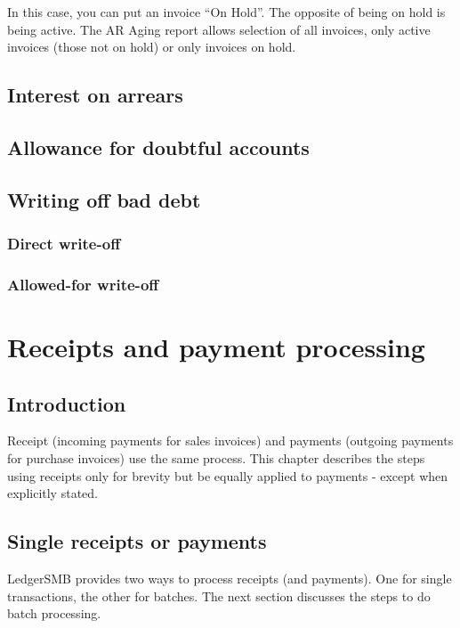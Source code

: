 In this case, you can put an invoice ``On Hold''. The opposite of being on hold is
being active. The AR Aging report allows selection of all invoices, only active
invoices (those not on hold) or only invoices on hold.


\section{Interest on arrears}

\section{Allowance for doubtful accounts}



\section{Writing off bad debt}

\subsection{Direct write-off}

\subsection{Allowed-for write-off}


\chapter{Receipts and payment processing}

\section{Introduction}

Receipt (incoming payments for sales invoices) and payments (outgoing payments
for purchase invoices) use the same process. This chapter describes the steps
using receipts only for brevity but be equally applied to payments - except
when explicitly stated.

\section{Single receipts or payments}
\label{sec:SinglePayments}

LedgerSMB provides two ways to process receipts (and payments). One for single transactions,
the other for batches. The next section discusses the steps to do batch processing.

